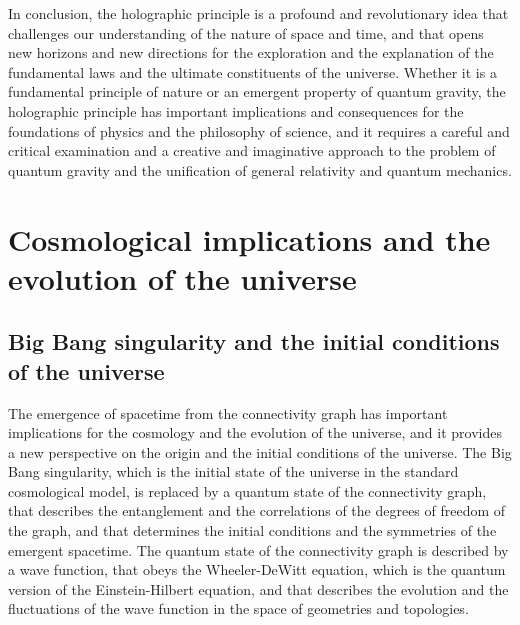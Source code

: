 \begin{tcolorbox}[colback=green!5!white,colframe=green!75!black,title=Question]
    In conclusion, the holographic principle is a profound and revolutionary idea that challenges our understanding of the nature of space and time, and that opens new horizons and new directions for the exploration and the explanation of the fundamental laws and the ultimate constituents of the universe. Whether it is a fundamental principle of nature or an emergent property of quantum gravity, the holographic principle has important implications and consequences for the foundations of physics and the philosophy of science, and it requires a careful and critical examination and a creative and imaginative approach to the problem of quantum gravity and the unification of general relativity and quantum mechanics.
\end{tcolorbox}

\section{Cosmological implications and the evolution of the universe}
\subsection{Big Bang singularity and the initial conditions of the universe}
The emergence of spacetime from the connectivity graph has important implications for the cosmology and the evolution of the universe, and it provides a new perspective on the origin and the initial conditions of the universe. The Big Bang singularity, which is the initial state of the universe in the standard cosmological model, is replaced by a quantum state of the connectivity graph, that describes the entanglement and the correlations of the degrees of freedom of the graph, and that determines the initial conditions and the symmetries of the emergent spacetime. The quantum state of the connectivity graph is described by a wave function, that obeys the Wheeler-DeWitt equation, which is the quantum version of the Einstein-Hilbert equation, and that describes the evolution and the fluctuations of the wave function in the space of geometries and topologies.

